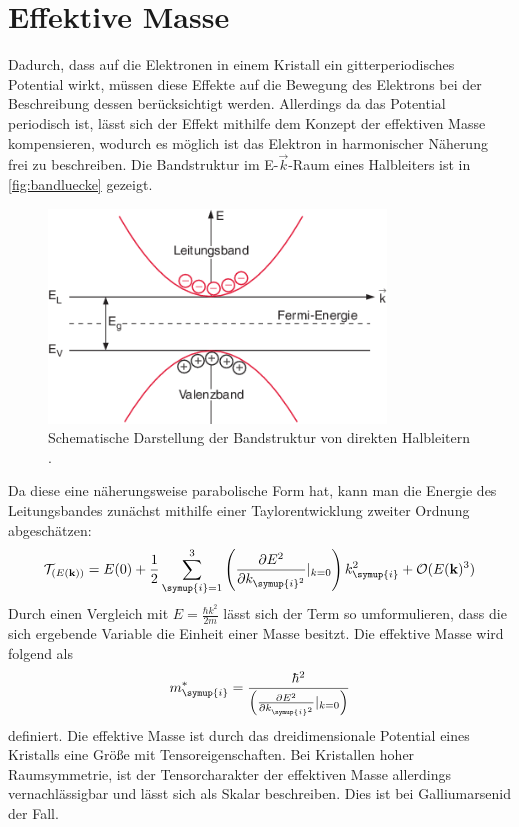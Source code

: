 \section{Effektive Masse}
Dadurch, dass auf die Elektronen in einem Kristall ein gitterperiodisches Potential wirkt, müssen diese Effekte auf die Bewegung des Elektrons bei der Beschreibung
dessen berücksichtigt werden. Allerdings da das Potential periodisch ist, lässt sich der Effekt mithilfe dem Konzept der effektiven Masse kompensieren, wodurch es möglich ist
das Elektron in harmonischer Näherung frei zu beschreiben. Die Bandstruktur im E-$\vec{k}$-Raum eines Halbleiters ist in \autoref{fig:bandluecke} gezeigt. 
\begin{figure}
    \centering
    \includegraphics[width = 0.8\textwidth]{content/V46_pictures/Bandstruktur.png}
    \caption{Schematische Darstellung der Bandstruktur von direkten Halbleitern \cite{Demtröder2016}.}
    \label{fig:bandluecke}
\end{figure}
Da diese eine näherungsweise parabolische Form hat, kann man die Energie des Leitungsbandes zunächst mithilfe einer Taylorentwicklung zweiter Ordnung abgeschätzen:
\begin{equation*}
    \mathcal{T}_{(E(\mathbf{k}))} = E(0) + \frac{1}{2}\sum_{\symup{i}=1}^{3}\left(\frac{\partial E^2}{\partial k_{\symup{i}^2}}|_{k=0}\right) k_{\symup{i}}^2 + \mathcal{O}(E(\mathbf{k})^3)
\end{equation*}
Durch einen Vergleich mit $E=\frac{\hbar k^2}{2m}$ lässt sich der Term so umformulieren, dass die sich ergebende Variable die Einheit einer Masse besitzt. Die effektive Masse wird folgend als
\begin{equation*}
    m_{\symup{i}}^{*}=\frac{\hbar^2}{\left(\frac{\partial E^2}{\partial k_{\symup{i}^2}}|_{k=0}\right)}
\end{equation*}
definiert. Die effektive Masse ist durch das dreidimensionale Potential eines Kristalls eine Größe mit Tensoreigenschaften. Bei Kristallen hoher Raumsymmetrie, ist der Tensorcharakter der effektiven Masse
allerdings vernachlässigbar und lässt sich als Skalar beschreiben. Dies ist bei Galliumarsenid der Fall.

